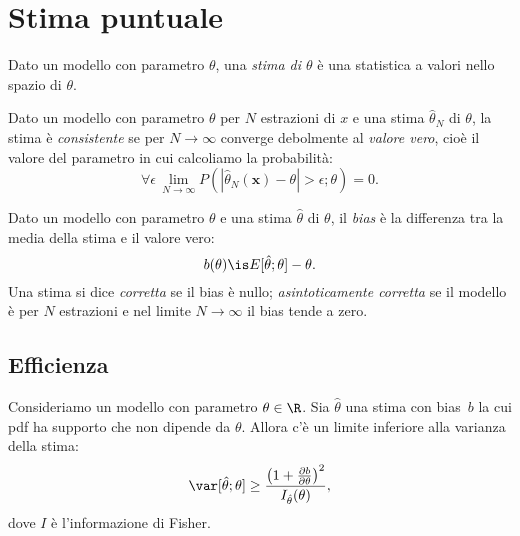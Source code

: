 
\section{Stima puntuale}

\begin{definition}[Stima]
	Dato un modello con parametro $\theta$,
	una \emph{stima di $\theta$} è una statistica a valori nello spazio di $\theta$.
\end{definition}

\begin{definition}[Consistenza]
	Dato un modello con parametro $\theta$ per $N$ estrazioni di $x$
	e una stima $\hat\theta_N$ di $\theta$,
	la stima è \emph{consistente}
	se per $N\to\infty$ converge debolmente al \emph{valore vero},
	cioè il valore del parametro in cui calcoliamo la probabilità:
	\begin{equation*}
		\forall\epsilon\, \lim_{N\to\infty} P(|\hat\theta_N(\mathbf x)-\theta| > \epsilon;\theta) = 0.
	\end{equation*}
\end{definition}

\begin{definition}[Bias]
	Dato un modello con parametro $\theta$ e una stima $\hat\theta$ di $\theta$,
	il \emph{bias} è la differenza tra la media della stima e il valore vero:
	\begin{equation*}
		b(\theta) \is E[\hat\theta;\theta] - \theta.
	\end{equation*}
	Una stima si dice \emph{corretta} se il bias è nullo;
	\emph{asintoticamente corretta} se il modello è per $N$ estrazioni
	e nel limite $N\to\infty$ il bias tende a zero.
\end{definition}

\subsection{Efficienza}

\begin{theorem}
	\label{th:cramerrao}
	Consideriamo un modello con parametro $\theta\in\R$.
	Sia $\hat\theta$ una stima con bias~$b$
	la cui pdf ha supporto che non dipende da $\theta$.
	Allora c'è un limite inferiore alla varianza della stima:
	\begin{equation*}
		\var[\hat\theta;\theta] \ge \frac{\left( 1 + \frac{\partial b}{\partial\theta} \right)^2}{I_{\hat\theta}(\theta)},
	\end{equation*}
	dove $I$ è l'informazione di Fisher.
\end{theorem}

